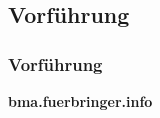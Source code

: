 \documentclass[professionalfont,serif,german]{beamer}
\begin{document}

\begin{frame}
  \section[Vorführung]{Vorführung}
  \frametitle{Vorführung}
  \begin{center}
    \textbf{bma.fuerbringer.info}
  \end{center}
\end{frame}
\end{document}
